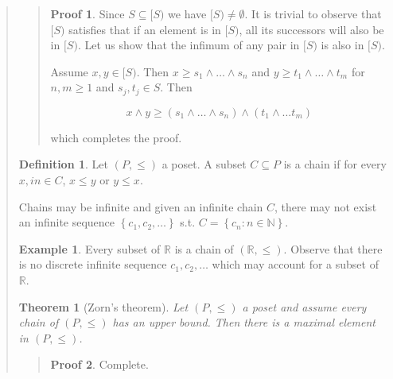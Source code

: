 \documentclass[a4paper, 12pt]{article}
\newtheorem{theorem}{Theorem}
\theoremstyle{definition}
\theoremstyle{definition}
\newtheorem{example}{Example}
\theoremstyle{definition}
\newtheorem{definition}{Definition}
\newtheorem{pro}{Proof}
\begin{document}
\begin{quote}
\small
\begin{quote}

\begin{pro}
    Since $S \subseteq [S)$ we have $[S) \neq \emptyset$. It is trivial to observe 
    that $[S)$ satisfies that if an element is in $[S)$, all 
    its successors will also be in $[S)$. Let us show that 
    the infimum of any pair in $[S)$ is also in $[S)$.

    Assume $x, y \in [S)$. Then $x \geq s_1 \land  \ldots \land  s_n$ and $y
    \geq t_1\land \ldots \land  t_m$ for $n, m \geq 1$ and $s_j, t_j \in S$.
    Then 

    \begin{equation*}
        x \land  y \geq (s_1 \land  \ldots \land s_n) \land (t_1 \land  \ldots t_m)
    \end{equation*}

    which completes the proof.
\end{pro}

\end{quote}
\normalsize

\begin{definition}
    Let $(P, \leq)$ a poset. A subset $C \subseteq P$ is a chain if for every
    $x, in \in C$, $x \leq y$ or $y \leq x$.
\end{definition}

Chains may be infinite and given an infinite chain $C$, there may not exist an
infinite sequence $\left\{ c_1, c_2, \ldots \right\} $ s.t. $C = \left\{ c_n :
n \in \mathbb{N} \right\} $.

\begin{example}
    Every subset of $\mathbb{R}$ is a chain of $(\mathbb{R}, \leq)$. Observe
    that there is no discrete infinite sequence $c_1, c_2,\ldots$ which may
    account for a subset of $\mathbb{R}$.
\end{example}


\begin{theorem}[Zorn's theorem]
    Let $(P, \leq) $ a poset and assume every chain of $(P, \leq) $ has an
    upper bound. Then there is a maximal element in $(P, \leq) $.
\end{theorem}


\small
\begin{quote}

\begin{pro}
    Complete.
\end{pro}

\end{quote}
\normalsize


\end{quote}
\end{document}
